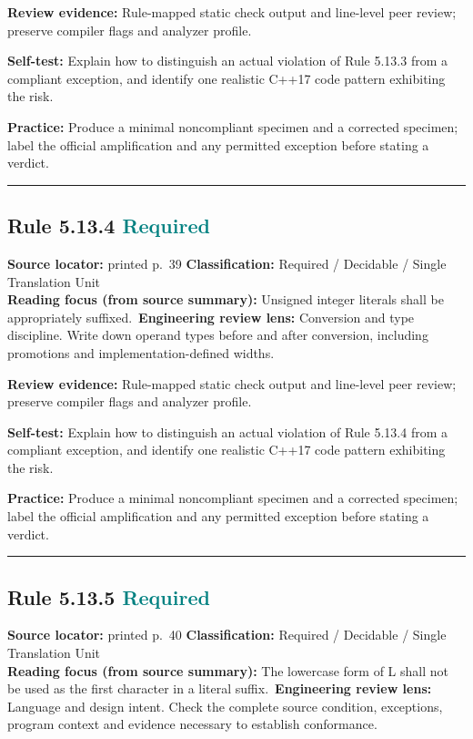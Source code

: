 \documentclass[10pt,letterpaper]{article}
\begin{document}
\textbf{Review evidence:} Rule-mapped static check output and line-level peer review; preserve compiler flags and analyzer profile.

\textbf{Self-test:} Explain how to distinguish an actual violation of Rule 5.13.3 from a compliant exception, and identify one realistic C++17 code pattern exhibiting the risk.\par
\textbf{Practice:} Produce a minimal noncompliant specimen and a corrected specimen; label the official amplification and any permitted exception before stating a verdict.
\smallskip\hrule\smallskip
\subsection*{Rule 5.13.4 \enspace \texorpdfstring{\small\textcolor{teal}{Required}}{Required}}
\noindent\textbf{Source locator:} printed p.~39 \quad\textbf{Classification:} Required / Decidable / Single Translation Unit\\
\textbf{Reading focus (from source summary):} Unsigned integer literals shall be appropriately suffixed.\
\textbf{Engineering review lens:} Conversion and type discipline. Write down operand types before and after conversion, including promotions and implementation-defined widths.

\textbf{Review evidence:} Rule-mapped static check output and line-level peer review; preserve compiler flags and analyzer profile.

\textbf{Self-test:} Explain how to distinguish an actual violation of Rule 5.13.4 from a compliant exception, and identify one realistic C++17 code pattern exhibiting the risk.\par
\textbf{Practice:} Produce a minimal noncompliant specimen and a corrected specimen; label the official amplification and any permitted exception before stating a verdict.
\smallskip\hrule\smallskip
\subsection*{Rule 5.13.5 \enspace \texorpdfstring{\small\textcolor{teal}{Required}}{Required}}
\noindent\textbf{Source locator:} printed p.~40 \quad\textbf{Classification:} Required / Decidable / Single Translation Unit\\
\textbf{Reading focus (from source summary):} The lowercase form of L shall not be used as the first character in a literal suffix.\
\textbf{Engineering review lens:} Language and design intent. Check the complete source condition, exceptions, program context and evidence necessary to establish conformance.
\end{document}
